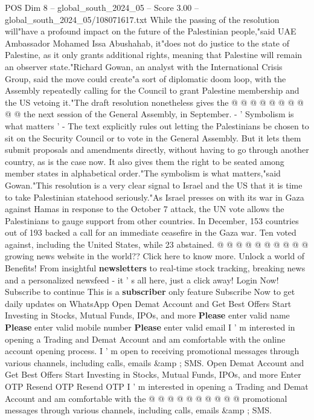 \begin{textsample}{POS Dim 8 – global\_south\_2024\_05 – Score 3.00 – global\_south\_2024\_05/108071617.txt}
While the passing of the resolution will"have a profound impact on the future of the Palestinian people,"said UAE Ambassador Mohamed Issa Abushahab, it"does not do justice to the state of Palestine, as it only grants additional rights, meaning that Palestine will remain an observer state."Richard Gowan, an analyst with the International Crisis Group, said the move could create"a sort of diplomatic doom loop, with the Assembly repeatedly calling for the Council to grant Palestine membership and the US vetoing it."The draft resolution nonetheless gives the @ @ @ @ @ @ @ @ @ @ the next session of the General Assembly, in September. - ' Symbolism is what matters ' - The text explicitly rules out letting the Palestinians be chosen to sit on the Security Council or to vote in the General Assembly.
But it lets them submit proposals and amendments directly, without having to go through another country, as is the case now.
It also gives them the right to be seated among member states in alphabetical order."The symbolism is what matters,"said Gowan."This resolution is a very clear signal to Israel and the US that it is time to take Palestinian statehood seriously."As Israel presses on with its war in Gaza against Hamas in response to the October 7 attack, the UN vote allows the Palestinians to gauge support from other countries.
In December, 153 countries out of 193 backed a call for an immediate ceasefire in the Gaza war.
Ten voted against, including the United States, while 23 abstained. @ @ @ @ @ @ @ @ @ @ growing news website in the world??
Click here to know more.
Unlock a world of Benefits!
From insightful \textbf{newsletters} to real-time stock tracking, breaking news and a personalized newsfeed - it ' s all here, just a click away!
Login Now!
Subscribe to continue This is a \textbf{subscriber} only feature Subscribe Now to get daily updates on WhatsApp Open Demat Account and Get Best Offers Start Investing in Stocks, Mutual Funds, IPOs, and more \textbf{Please} enter valid name \textbf{Please} enter valid mobile number \textbf{Please} enter valid email I ' m interested in opening a Trading and Demat Account and am comfortable with the online account opening process.
I ' m open to receiving promotional messages through various channels, including calls, emails \&amp ; SMS.
Open Demat Account and Get Best Offers Start Investing in Stocks, Mutual Funds, IPOs, and more Enter OTP Resend OTP Resend OTP I ' m interested in opening a Trading and Demat Account and am comfortable with the @ @ @ @ @ @ @ @ @ @ promotional messages through various channels, including calls, emails \&amp ; SMS.

\end{textsample}

